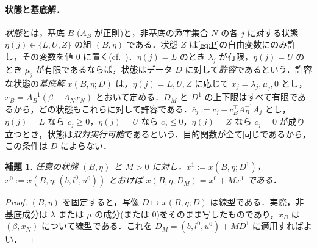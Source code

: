 \documentclass[11pt,a4paper]{ltjsarticle}
\theoremstyle{plain}
\newtheorem{lemma}[theorem]{補題}
\theoremstyle{definition}
\theoremstyle{remark}
\begin{document}
\paragraph{状態と基底解．}
\emph{状態}とは，基底 $B$ ($A_B$ が正則)と，非基底の添字集合 $N$ の各 $j$ に対する状態 $\eta(j)\in\{L,U,Z\}$ の組 $(B,\eta)$ である．状態 $Z$ は\eqref{eq:P}の自由変数にのみ許し，その変数を値 $0$ に置く(cf.~\cite{maros2003})．$\eta(j)=L$ のとき $\lambda_j$ が有限，$\eta(j)=U$ のとき $\mu_j$ が有限であるならば，状態はデータ $D$ に対して\emph{許容}であるという．許容な状態の\emph{基底解} $x(B,\eta;D)$ は，$\eta(j)=L,U,Z$ に応じて $x_j=\lambda_j,\mu_j,0$ とし，$x_B=A_B^{-1}(\beta-A_Nx_N)$ とおいて定める．$D_M$ と $D^1$ の上下限はすべて有限であるから，どの状態もこれらに対して許容である．$\bar c_j:=c_j-c_B^\top A_B^{-1}A_j$ とし，$\eta(j)=L$ なら $\bar c_j\ge0$，$\eta(j)=U$ なら $\bar c_j\le0$，$\eta(j)=Z$ なら $\bar c_j=0$ が成り立つとき，状態は\emph{双対実行可能}であるという．目的関数が全て同じであるから，この条件は $D$ によらない．

\begin{lemma}
\label{lem:affine}
任意の状態 $(B,\eta)$ と $M>0$ に対し，$x^1:=x(B,\eta;D^1)$，$x^0:=x(B,\eta;(b,l^0,u^0))$ とおけば $x(B,\eta;D_M)=x^0+Mx^1$ である．
\end{lemma}
\begin{proof}
$(B,\eta)$ を固定すると，写像 $D\mapsto x(B,\eta;D)$ は線型である．実際，非基底成分は $\lambda$ または $\mu$ の成分(または $0$)をそのまま写したものであり，$x_B$ は $(\beta,x_N)$ について線型である．これを $D_M=(b,l^0,u^0)+MD^1$ に適用すればよい．
\end{proof}
\end{document}
